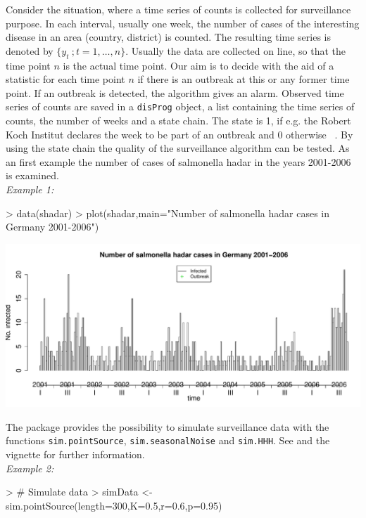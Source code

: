 \documentclass[a4paper,11pt]{article}
\begin{document}
Consider the situation, where a time series of counts is collected for surveillance purpose. In each interval, usually one week, the number of cases of the interesting disease in an area (country, district) is counted. The resulting time series is denoted by $\{y_t\>;t=1,\ldots,n\}$. Usually the data are collected on line, so that the time point $n$ is the actual time point. Our aim is to decide with the aid of a statistic for each time point $n$ if there is an outbreak at this or any former time point. If an outbreak is detected, the algorithm gives an alarm. Observed time series of counts are saved in a \verb+disProg+ object, a list containing the time series of counts, the number of weeks and a state chain.  
The state is 1, if e.g. the Robert Koch Institut declares the week to be part of an outbreak and 0 otherwise ~\citep{survstat}. By using the state chain the quality of the surveillance algorithm can be tested.
As an first example the number of cases of salmonella hadar in the years 2001-2006 is examined.  \\

\textit{Example 1:}
\begin{Schunk}
\begin{Sinput}
> data(shadar)
> plot(shadar,main="Number of salmonella hadar cases in Germany 2001-2006")
\end{Sinput}
\end{Schunk}
\includegraphics{figs/vignette_glrnb-002}

The package provides the possibility to simulate surveillance data with the functions \verb+sim.pointSource+, \verb+sim.seasonalNoise+ and \verb+sim.HHH+. See \citep{hoehle2007R} and the vignette for further information. \\

\textit{Example 2:}

\begin{Schunk}
\begin{Sinput}
> # Simulate data
> simData <- sim.pointSource(length=300,K=0.5,r=0.6,p=0.95)
\end{Sinput}
\end{Schunk}
\end{document}
